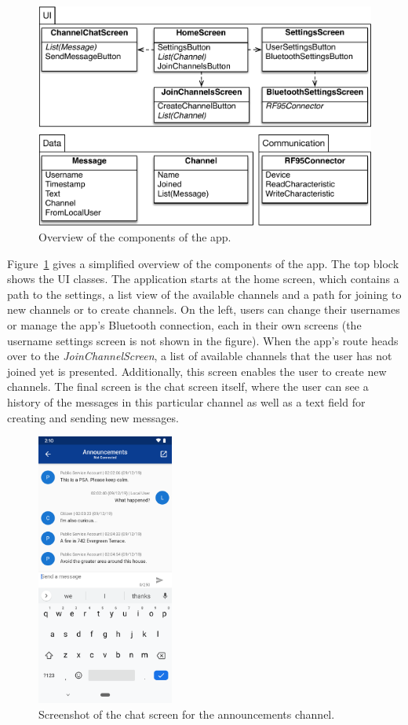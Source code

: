 \begin{figure}[ht!]
    \centering
    \includegraphics[width=.7\columnwidth]{gfx/bluera-uml.pdf}
    \caption{Overview of the components of the app.}
    \label{fig:app_uml}
\end{figure}

Figure~\ref{fig:app_uml} gives a simplified overview of the components of the app.
The top block shows the UI classes.
The application starts at the home screen, which contains a path to the settings, a list view of the available channels and a path for joining to new channels or to create channels.
On the left, users can change their usernames or manage the app's Bluetooth connection, each in their own screens (the username settings screen is not shown in the figure).
When the app's route heads over to the \emph{JoinChannelScreen}, a list of available channels that the user has not joined yet is presented.
Additionally, this screen enables the user to create new channels.
The final screen is the chat screen itself, where the user can see a history of the messages in this particular channel as well as a text field for creating and sending new messages.

\begin{figure}[ht!]
    \centering
    \includegraphics[width=0.4\textwidth]{gfx/bluera-screenshot.png}
    \caption{Screenshot of the chat screen for the announcements channel.}
    \label{fig:app_screenshot}
\end{figure}

